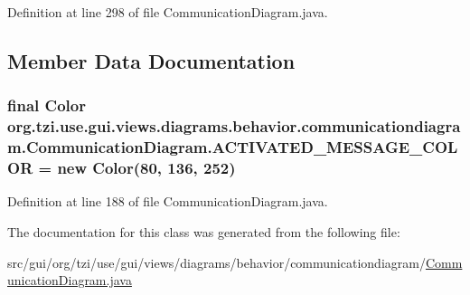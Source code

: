 Definition at line 298 of file Communication\-Diagram.\-java.



\subsection{Member Data Documentation}
\hypertarget{classorg_1_1tzi_1_1use_1_1gui_1_1views_1_1diagrams_1_1behavior_1_1communicationdiagram_1_1_communication_diagram_a6fe11a13d3c06194b0036889588d4ada}{
\subsubsection[{A\-C\-T\-I\-V\-A\-T\-E\-D\-\_\-\-M\-E\-S\-S\-A\-G\-E\-\_\-\-C\-O\-L\-O\-R}]{\setlength{\rightskip}{0pt plus 5cm}final Color org.\-tzi.\-use.\-gui.\-views.\-diagrams.\-behavior.\-communicationdiagram.\-Communication\-Diagram.\-A\-C\-T\-I\-V\-A\-T\-E\-D\-\_\-\-M\-E\-S\-S\-A\-G\-E\-\_\-\-C\-O\-L\-O\-R = new Color(80, 136, 252)\hspace{0.3cm}{\ttfamily [static]}}}\label{classorg_1_1tzi_1_1use_1_1gui_1_1views_1_1diagrams_1_1behavior_1_1communicationdiagram_1_1_communication_diagram_a6fe11a13d3c06194b0036889588d4ada}


Definition at line 188 of file Communication\-Diagram.\-java.



The documentation for this class was generated from the following file\-:\begin{DoxyCompactItemize}
\item 
src/gui/org/tzi/use/gui/views/diagrams/behavior/communicationdiagram/\hyperlink{_communication_diagram_8java}{Communication\-Diagram.\-java}\end{DoxyCompactItemize}
